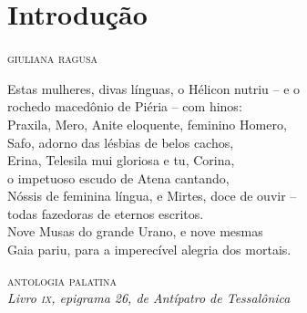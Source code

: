 \chapter*{Introdução }



\begin{flushright}
\textsc{giuliana ragusa}
\end{flushright}



\epigraph{Estas mulheres, divas línguas, o Hélicon nutriu -- e o  \\
rochedo macedônio de Piéria -- com hinos: \\
Praxila, Mero, Anite eloquente, feminino Homero, \\
Safo, adorno das lésbias de belos cachos, \\
Erina, Telesila mui gloriosa e tu, Corina, \\
o impetuoso escudo de Atena cantando, \\
Nóssis de feminina língua, e Mirtes, doce de ouvir --  \\
todas fazedoras de eternos escritos. \\
Nove Musas do grande Urano, e nove mesmas \\
Gaia pariu, para a imperecível alegria dos mortais.}
{\textsc{antologia palatina}\footnotemark{}\\\textit{Livro \textsc{ix}, epigrama 26, de Antípatro de Tessalônica}\footnotemark{}}
\addtocounter{footnote}{-2}

